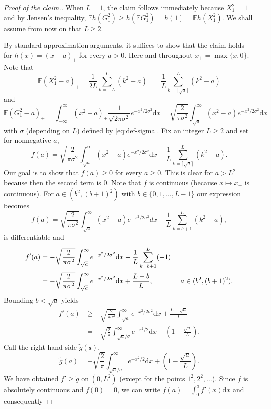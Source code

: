 \documentclass[10pt]{article}
\newcommand{\dd}{\mathrm{d}}
\newcommand{\E}{\mathbb{E}}
\newcommand{\1}{\textbf{1}}
\theoremstyle{remark}
\theoremstyle{definition}
\begin{document}
\begin{proof}[Proof of the claim.]
When $L=1$, the claim follows immediately because $X_1^2 = 1$ and by Jensen's inequality, $\E h(G_1^2) \geq h(\E G_1^2) = h(1) = \E h(X_1^2)$. We shall assume from now on that $L \geq 2$.

By standard approximation arguments, it suffices to show that the claim holds for $h(x) = (x-a)_+$ for every $a > 0$. Here and throughout $x_+ = \max\{x,0\}$. Note that 
\[
\mathbb{E}(X_1^2-a)_+ = \frac{1}{2L}\sum_{k=-L}^L(k^2-a)_+ = \frac{1}{L}\sum_{k = \lceil \sqrt{a} \rceil}^L (k^2-a)
\]
and
\[
\mathbb{E}(G_1^2-a)_+ = \int_{-\infty}^{\infty}(x^2-a)_+\frac{1}{\sqrt{2 \pi \sigma^2}}e^{-x^2/2\sigma^2}\dd x =\sqrt{\frac{2}{\pi \sigma^2}}\int_{\sqrt{a}}^{\infty}(x^2-a)e^{-x^2/2\sigma^2}\dd x
\]
with $\sigma$ (depending on $L$) defined by \eqref{eq:def-sigma}.
Fix an integer $L \geq 2$ and set for nonnegative $a$,
\[
f(a) = \sqrt{\frac{2}{\pi \sigma^2}}\int_{\sqrt{a}}^{\infty}(x^2-a)e^{-x^2/2\sigma^2}\dd x-\frac{1}{L}\sum_{k = \lceil \sqrt{a} \rceil}^L (k^2-a).
\]
Our goal is to show that $f(a) \geq 0$ for every $a \geq 0$. This is clear for $a > L^2$ because then the second term is $0$. Note that $f$ is continuous (because $x \mapsto x_+$ is continuous). For $a \in (b^2, (b+1)^2)$ with $b \in \{0,1,\ldots,L-1\}$ our expression becomes 
\[
f(a) = \sqrt{\frac{2}{\pi \sigma^2}}\int_{\sqrt{a}}^{\infty}(x^2-a)e^{-x^2/2\sigma^2}dx-\frac{1}{L}\sum_{k=b+1}^L (k^2-a),
\]
is differentiable and
\begin{align}
f'(a) &=  -\sqrt{\frac{2}{\pi \sigma^2}}\int_{\sqrt{a}}^{\infty}e^{-x^2/2 \sigma^2}\dd x- \frac{1}{L}\sum_{k = b+1}^L (-1) \notag\\
&= -\sqrt{\frac{2}{\pi \sigma^2}}\int_{\sqrt{a}}^{\infty}e^{-x^2/2 \sigma^2}\dd x + \frac{L-b}{L}, \qquad\qquad a \in (b^2,(b+1)^2).\label{eq:f'}
\end{align}
Bounding $b < \sqrt{a}$ yields
\begin{align*}
f'(a) &\geq -\sqrt{\frac{2}{\pi \sigma^2}}\int_{\sqrt{a}}^{\infty}e^{-x^2/2 \sigma^2}\dd x + \frac{L-\sqrt{a}}{L} \\
&= -\sqrt{\frac{2}{\pi}}\int_{\sqrt{a}/\sigma}^{\infty}e^{-x^2/2}\dd x + \left(1 -  \frac{\sqrt{a}}{L}\right).
\end{align*}
Call the right hand side $\tilde g(a)$,
\[
\tilde g(a) = -\sqrt{\frac{2}{\pi}}\int_{\sqrt{a}/\sigma}^{\infty}e^{-x^2/2}\dd x + \left(1 -  \frac{\sqrt{a}}{L}\right).
\]
We have obtained $f' \geq \tilde g$ on $(0,L^2)$ (except for the points $1^2, 2^2, \ldots$). Since $f$ is absolutely continuous and $f(0) = 0$, we can write $f(a) = \int_0^a f'(x) \dd x$ and consequently

\end{proof}
\end{document}
